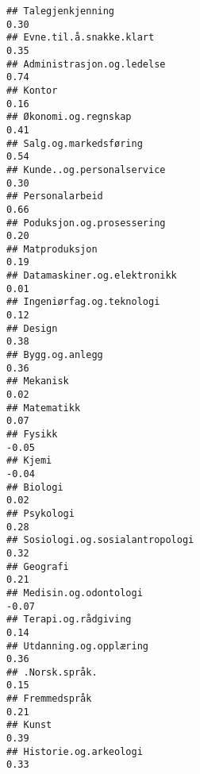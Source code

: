 \documentclass[
]{article}
\begin{document}
\begin{verbatim}
## Talegjenkjenning                                                                  0.30
## Evne.til.å.snakke.klart                                                           0.35
## Administrasjon.og.ledelse                                                         0.74
## Kontor                                                                            0.16
## Økonomi.og.regnskap                                                               0.41
## Salg.og.markedsføring                                                             0.54
## Kunde..og.personalservice                                                         0.30
## Personalarbeid                                                                    0.66
## Poduksjon.og.prosessering                                                         0.20
## Matproduksjon                                                                     0.19
## Datamaskiner.og.elektronikk                                                       0.01
## Ingeniørfag.og.teknologi                                                          0.12
## Design                                                                            0.38
## Bygg.og.anlegg                                                                    0.36
## Mekanisk                                                                          0.02
## Matematikk                                                                        0.07
## Fysikk                                                                           -0.05
## Kjemi                                                                            -0.04
## Biologi                                                                           0.02
## Psykologi                                                                         0.28
## Sosiologi.og.sosialantropologi                                                    0.32
## Geografi                                                                          0.21
## Medisin.og.odontologi                                                            -0.07
## Terapi.og.rådgiving                                                               0.14
## Utdanning.og.opplæring                                                            0.36
## .Norsk.språk.                                                                     0.15
## Fremmedspråk                                                                      0.21
## Kunst                                                                             0.39
## Historie.og.arkeologi                                                             0.33

\end{verbatim}
\end{document}
